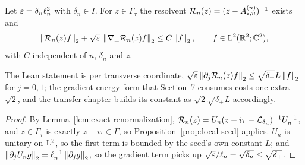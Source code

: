 \begin{corollary}
  \label{cor:scaled-local-resolvents}
  \leanok
  Let $\varepsilon=\delta_n\ell_n^2$ with $\delta_n\in I$.  For $z\in\Gamma_\tau$ the resolvent
  $\mathcal{R}_n(z)=(z-A^{(n)}_{\varepsilon,n})^{-1}$ exists and
  \begin{equation}
    \left\|\mathcal{R}_n(z)f\right\|_2+\sqrt{\varepsilon}\,\left\|\nabla_\perp\mathcal{R}_n(z)f\right\|_2\leq C\left\|f\right\|_2,
    \qquad f\in\mathrm{L}^2(\mathbb{R}^2;\mathbb{C}^2),
    \label{eq:background:local-gradient}
  \end{equation}
  with $C$ independent of $n$, $\delta_n$ and $z$.
\end{corollary}

The Lean statement is per transverse coordinate,
$\sqrt{\varepsilon}\left\|\partial_j\mathcal{R}_n(z)f\right\|_2\leq\sqrt{\delta_+}L\left\|f\right\|_2$ for $j=0,1$; the
gradient-energy form that Section~7 consumes costs one extra $\sqrt2$, and the transfer
chapter
builds its constant as $\sqrt2\sqrt{\delta_+}L$ accordingly.

\begin{proof}
  \leanok
  By Lemma~\ref{lem:exact-renormalization},
  $\mathcal{R}_n(z)=U_n(z+i\tau-\mathcal{L}_{\delta_n})^{-1}U_n^{-1}$, and $z\in\Gamma_\tau$ is exactly
  $z+i\tau\in\Gamma$, so Proposition~\ref{prop:local-seed} applies.  $U_n$ is unitary on
  $\mathrm{L}^2$, so the first term is bounded by the seed's own constant $L$; and
  $\left\|\partial_jU_ng\right\|_2=\ell_n^{-1}\left\|\partial_jg\right\|_2$, so the gradient term picks up
  $\sqrt{\varepsilon}/\ell_n=\sqrt{\delta_n}\leq\sqrt{\delta_+}$.
\end{proof}

